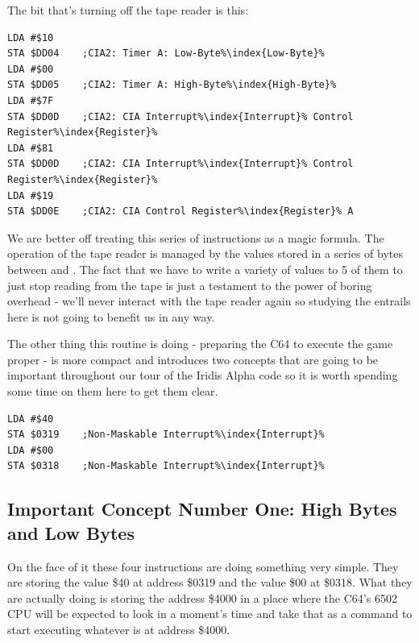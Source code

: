 The bit that's turning off the tape reader is this:

\begin{lstlisting}[escapechar=\%]
LDA #$10
STA $DD04    ;CIA2: Timer A: Low-Byte%\index{Low-Byte}%
LDA #$00
STA $DD05    ;CIA2: Timer A: High-Byte%\index{High-Byte}%
LDA #$7F
STA $DD0D    ;CIA2: CIA Interrupt%\index{Interrupt}% Control Register%\index{Register}%
LDA #$81
STA $DD0D    ;CIA2: CIA Interrupt%\index{Interrupt}% Control Register%\index{Register}%
LDA #$19
STA $DD0E    ;CIA2: CIA Control Register%\index{Register}% A
\end{lstlisting}

We are better off treating this series of instructions as a magic formula. The operation of the tape reader
is managed by the values stored in a series of bytes between  and . The fact that
we have to write a variety of values to 5 of them to just stop reading from the tape is just a testament
to the power of boring overhead - we'll never interact with the tape reader again so studying the entrails
here is not going to benefit us in any way.

The other thing this routine is doing - preparing the C64 to execute the game proper - is more compact and
introduces two concepts that are going to be important throughout our tour of the Iridis Alpha code so it
is worth spending some time on them here to get them clear.

\begin{lstlisting}[caption=Containing two important concepts.,escapechar=\%]
LDA #$40
STA $0319    ;Non-Maskable Interrupt%\index{Interrupt}%
LDA #$00
STA $0318    ;Non-Maskable Interrupt%\index{Interrupt}%
\end{lstlisting}

\subsection{Important Concept Number One: High Bytes and Low Bytes}
On the face of it these four instructions are doing something very simple. They are storing the value \$40
at address \$0319 and the value \$00 at \$0318. What they are actually doing is storing the address \$4000
in a place where the C64's 6502 CPU will be expected to look in a moment's time and take that as a command
to start executing whatever is at address \$4000.


